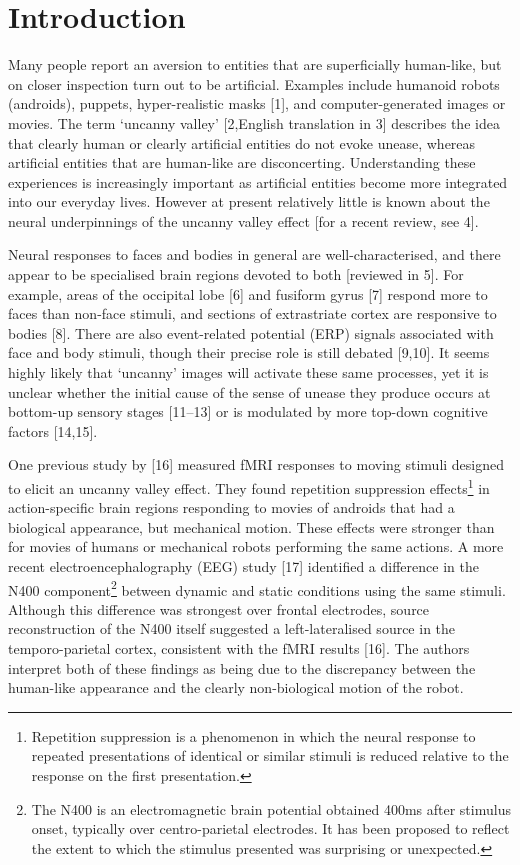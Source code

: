 \documentclass[
]{article}
\begin{document}
\section{Introduction}\label{introduction}

Many people report an aversion to entities that are superficially human-like, but on closer inspection turn out to be artificial. Examples include humanoid robots (androids), puppets, hyper-realistic masks {[}1{]}, and computer-generated images or movies. The term `uncanny valley' {[}2,English translation in 3{]} describes the idea that clearly human or clearly artificial entities do not evoke unease, whereas artificial entities that are human-like are disconcerting. Understanding these experiences is increasingly important as artificial entities become more integrated into our everyday lives. However at present relatively little is known about the neural underpinnings of the uncanny valley effect {[}for a recent review, see 4{]}.

Neural responses to faces and bodies in general are well-characterised, and there appear to be specialised brain regions devoted to both {[}reviewed in 5{]}. For example, areas of the occipital lobe {[}6{]} and fusiform gyrus {[}7{]} respond more to faces than non-face stimuli, and sections of extrastriate cortex are responsive to bodies {[}8{]}. There are also event-related potential (ERP) signals associated with face and body stimuli, though their precise role is still debated {[}9,10{]}. It seems highly likely that `uncanny' images will activate these same processes, yet it is unclear whether the initial cause of the sense of unease they produce occurs at bottom-up sensory stages {[}11--13{]} or is modulated by more top-down cognitive factors {[}14,15{]}.

One previous study by {[}16{]} measured fMRI responses to moving stimuli designed to elicit an uncanny valley effect. They found repetition suppression effects\footnote{Repetition suppression is a phenomenon in which the neural response to repeated presentations of identical or similar stimuli is reduced relative to the response on the first presentation.} in action-specific brain regions responding to movies of androids that had a biological appearance, but mechanical motion. These effects were stronger than for movies of humans or mechanical robots performing the same actions. A more recent electroencephalography (EEG) study {[}17{]} identified a difference in the N400 component\footnote{The N400 is an electromagnetic brain potential obtained 400ms after stimulus onset, typically over centro-parietal electrodes. It has been proposed to reflect the extent to which the stimulus presented was surprising or unexpected.} between dynamic and static conditions using the same stimuli. Although this difference was strongest over frontal electrodes, source reconstruction of the N400 itself suggested a left-lateralised source in the temporo-parietal cortex, consistent with the fMRI results {[}16{]}. The authors interpret both of these findings as being due to the discrepancy between the human-like appearance and the clearly non-biological motion of the robot.
\end{document}
